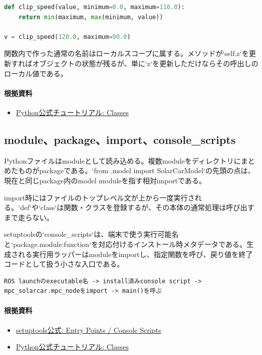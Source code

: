 \documentclass[a4paper,11pt]{article}
\begin{document}
\begin{lstlisting}[language=python]
def clip_speed(value, minimum=0.0, maximum=110.0):
    return min(maximum, max(minimum, value))

v = clip_speed(120.0, maximum=90.0)
\end{lstlisting}


関数内で作った通常の名前はローカルスコープに属する。メソッドが`self.z`を更新すればオブジェクトの状態が残るが、単に`z`を更新しただけならその呼出しのローカル値である。

\paragraph{根拠資料}
\begin{itemize}[leftmargin=1.6em]
\item \href{https://docs.python.org/3/tutorial/classes.html}{Python公式チュートリアル: Classes}
\end{itemize}

\subsection{module、package、import、console\_scripts}
Pythonファイルはmoduleとして読み込める。複数moduleをディレクトリにまとめたものがpackageである。`from .model import SolarCarModel`の先頭の点は、現在と同じpackage内のmodel moduleを指す相対importである。


import時にはファイルのトップレベル文が上から一度実行される。`def`や`class`は関数・クラスを登録するが、その本体の通常処理は呼び出すまで走らない。


setuptoolsの`console\_scripts`は、端末で使う実行可能名と`package.module:function`を対応付けるインストール時メタデータである。生成される実行用ラッパーはmoduleをimportし、指定関数を呼び、戻り値を終了コードとして扱う小さな入口である。


\begin{lstlisting}
ROS launchのexecutable名 -> install済みconsole script -> mpc_solarcar.mpc_nodeをimport -> main()を呼ぶ
\end{lstlisting}

\paragraph{根拠資料}
\begin{itemize}[leftmargin=1.6em]
\item \href{https://setuptools.pypa.io/en/latest/userguide/entry_point.html}{setuptools公式: Entry Points / Console Scripts}
\item \href{https://docs.python.org/3/tutorial/classes.html}{Python公式チュートリアル: Classes}
\end{itemize}
\end{document}
